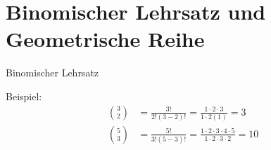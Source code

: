 \section{Binomischer Lehrsatz und Geometrische Reihe}

\textbullet\;\;Binomischer Lehrsatz
\begin{center}
\end{center}
\newpage
\noindent
Beispiel:\\
\begin{align*}
	\binom{3}{2}&=\frac{3!}{2!(3-2)!}=\frac{1\cdot2\cdot3}{1\cdot2(1)}=3 \\
	\binom{5}{3}&=\frac{5!}{3!(5-3)!}=\frac{1\cdot2\cdot3\cdot4\cdot5}{1\cdot2\cdot3\cdot2}=10 \\
\end{align*}

